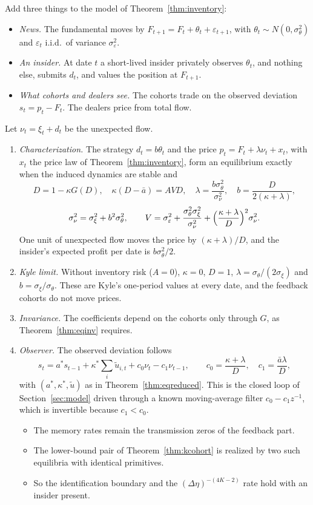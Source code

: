 \begin{theorem}\label{thm:insider}
Add three things to the model of Theorem~\ref{thm:inventory}:
\begin{itemize}[itemsep=1pt,topsep=2pt]
\item \emph{News.} The fundamental moves by $F_{t+1}=F_t+\theta_t+\varepsilon_{t+1}$, with $\theta_t\sim N(0,\sigma_\theta^2)$ and $\varepsilon_t$ i.i.d.\ of variance $\sigma_\varepsilon^2$.
\item \emph{An insider.} At date $t$ a short-lived insider privately observes $\theta_t$, and nothing else, submits $d_t$, and values the position at $F_{t+1}$.
\item \emph{What cohorts and dealers see.} The cohorts trade on the observed deviation $s_t=p_t-F_t$. The dealers price from total flow.
\end{itemize}
Let $\nu_t=\xi_t+d_t$ be the unexpected flow.
\begin{enumerate}[label=(\roman*),itemsep=1pt]
\item \emph{Characterization.} The strategy $d_t=b\theta_t$ and the price $p_t=F_t+\lambda\nu_t+x_t$, with $x_t$ the price law of Theorem~\ref{thm:inventory}, form an equilibrium exactly when the induced dynamics are stable and
\[
 D=1-\kappa G(D),\quad \kappa(D-\bar a)=AVD,\quad \lambda=\frac{b\sigma_\theta^2}{\sigma_\nu^2},\quad b=\frac{D}{2(\kappa+\lambda)},
\]
\[
 \sigma_\nu^2=\sigma_\xi^2+b^2\sigma_\theta^2,\qquad V=\sigma_\varepsilon^2+\frac{\sigma_\theta^2\sigma_\xi^2}{\sigma_\nu^2}+\Bigl(\frac{\kappa+\lambda}{D}\Bigr)^2\sigma_\nu^2 .
\]
One unit of unexpected flow moves the price by $(\kappa+\lambda)/D$, and the insider's expected profit per date is $b\sigma_\theta^2/2$.
\item \emph{Kyle limit.} Without inventory risk ($A=0$), $\kappa=0$, $D=1$, $\lambda=\sigma_\theta/(2\sigma_\xi)$ and $b=\sigma_\xi/\sigma_\theta$. These are Kyle's one-period values at every date, and the feedback cohorts do not move prices.
\item \emph{Invariance.} The coefficients depend on the cohorts only through $G$, as Theorem~\ref{thm:eqinv} requires.
\item \emph{Observer.} The observed deviation follows
\[
 s_t=a^*s_{t-1}+\kappa^*\sum_i\tilde u_{i,t}+c_0\nu_t-c_1\nu_{t-1},\qquad c_0=\frac{\kappa+\lambda}{D},\quad c_1=\frac{\bar a\lambda}{D},
\]
with $(a^*,\kappa^*,\tilde u)$ as in Theorem~\ref{thm:eqreduced}. This is the closed loop of Section~\ref{sec:model} driven through a known moving-average filter $c_0-c_1z^{-1}$, which is invertible because $c_1<c_0$.
\begin{itemize}[itemsep=1pt,topsep=2pt]
\item The memory rates remain the transmission zeros of the feedback part.
\item The lower-bound pair of Theorem~\ref{thm:kcohort} is realized by two such equilibria with identical primitives.
\item So the identification boundary and the $(\Delta\eta)^{-(4K-2)}$ rate hold with an insider present.
\end{itemize}
\end{enumerate}
\end{theorem}

